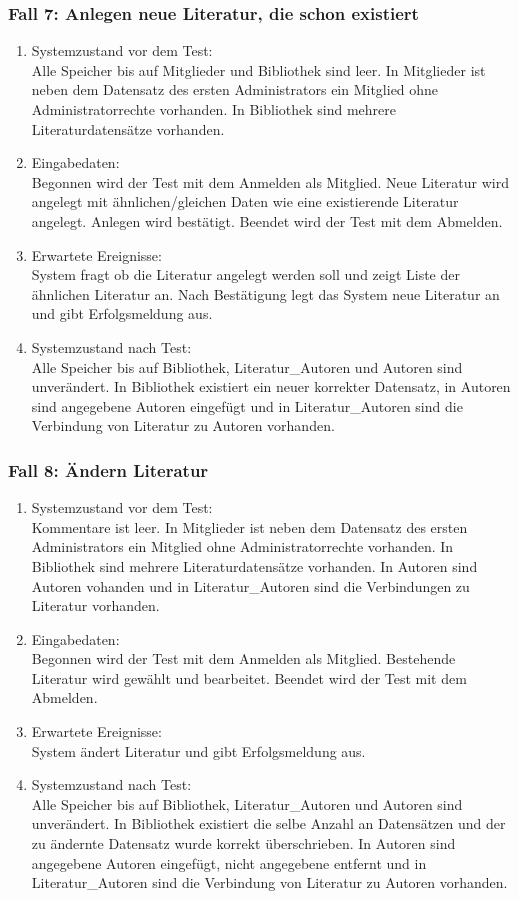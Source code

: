 \subsubsection{Fall 7: Anlegen neue Literatur, die schon existiert}
\begin{enumerate}
\item Systemzustand vor dem Test:\\
	Alle Speicher bis auf Mitglieder und Bibliothek sind leer. In Mitglieder ist neben dem Datensatz des ersten Administrators ein Mitglied ohne Administratorrechte vorhanden. In Bibliothek sind mehrere Literaturdatensätze vorhanden.
\item Eingabedaten:\\
	Begonnen wird der Test mit dem Anmelden als Mitglied. Neue Literatur wird angelegt mit ähnlichen/gleichen Daten wie eine existierende Literatur angelegt. Anlegen wird bestätigt. Beendet wird der Test mit dem Abmelden.
\item Erwartete Ereignisse:\\
	System fragt ob die Literatur angelegt werden soll und zeigt Liste der ähnlichen Literatur an. Nach Bestätigung legt das System neue Literatur an und gibt Erfolgsmeldung aus.
\item Systemzustand nach Test:\\
	Alle Speicher bis auf Bibliothek, Literatur\_Autoren und Autoren sind unverändert. In Bibliothek existiert ein neuer korrekter Datensatz, in Autoren sind angegebene Autoren eingefügt und in Literatur\_Autoren sind die Verbindung von Literatur zu Autoren vorhanden.
\end{enumerate}

\subsubsection{Fall 8: Ändern Literatur}
\begin{enumerate}
\item Systemzustand vor dem Test:\\
	Kommentare ist leer. In Mitglieder ist neben dem Datensatz des ersten Administrators ein Mitglied ohne Administratorrechte vorhanden. In Bibliothek sind mehrere Literaturdatensätze vorhanden. In Autoren sind Autoren vohanden und in Literatur\_Autoren sind die Verbindungen zu Literatur vorhanden.
\item Eingabedaten:\\
	Begonnen wird der Test mit dem Anmelden als Mitglied. Bestehende Literatur wird gewählt und bearbeitet. Beendet wird der Test mit dem Abmelden.
\item Erwartete Ereignisse:\\
	System ändert Literatur und gibt Erfolgsmeldung aus.
\item Systemzustand nach Test:\\
	Alle Speicher bis auf Bibliothek, Literatur\_Autoren und Autoren sind unverändert. In Bibliothek existiert die selbe Anzahl an Datensätzen und der zu ändernte Datensatz wurde korrekt überschrieben. In Autoren sind angegebene Autoren eingefügt, nicht angegebene entfernt und in Literatur\_Autoren sind die Verbindung von Literatur zu Autoren vorhanden.
\end{enumerate}

